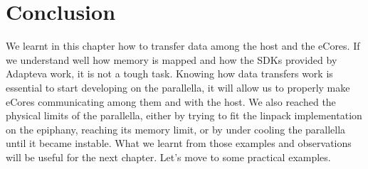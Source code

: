 
\section{Conclusion}

We learnt in this chapter how to transfer data among the host and the \glspl{eCore}. If we understand well how memory is mapped and how the \glspl{SDK} provided by Adapteva work, it is not a tough task. Knowing how data transfers work is essential to start developing on the parallella, it will allow us to properly make \glspl{eCore} communicating among them and with the host. We also reached the physical limits of the parallella, either by trying to fit the linpack implementation on the \gls{epiphany}, reaching its memory limit, or by under cooling the parallella until it became instable. What we learnt from those examples and observations will be useful for the next chapter. Let's move to some practical examples.